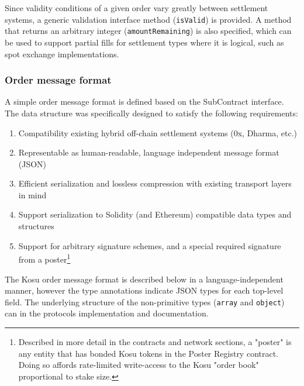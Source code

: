 \documentclass[10pt]{article}
\begin{document}
Since validity conditions of a given order vary greatly between settlement systems, a generic validation interface method (\texttt{isValid}) is provided. A method that returns an arbitrary integer (\texttt{amountRemaining}) is also specified, which can be used to support partial fills for settlement types where it is logical, such as spot exchange implementations.

\subsubsection{Order message format}\label{order-message-format}

A simple order message format is defined based on the SubContract interface. The data structure was specifically designed to satisfy the following requirements:

\begin{enumerate}
  \item Compatibility existing hybrid off-chain settlement systems (0x\cite{0x-wp}, Dharma\cite{dharma-wp}, etc.)
  \item Representable as human-readable, language independent message format (JSON)
  \item Efficient serialization and lossless compression with existing transport layers in mind
  \item Support serialization to Solidity (and Ethereum) compatible data types and structures
  \item Support for arbitrary signature schemes, and a special required signature from a poster\footnote{Described in more detail in the contracts and network sections, a "poster" is any entity that has bonded Kosu tokens in the Poster Registry contract. Doing so affords rate-limited write-access to the Kosu "order book" proportional to stake size.}
\end{enumerate}

The Kosu order message format is described below in a language-independent manner, however the type annotations indicate JSON types for each top-level field. The underlying structure of the non-primitive types (\texttt{array} and \texttt{object}) can in the protocols implementation\cite{kosu-monorepo} and documentation.
\end{document}
